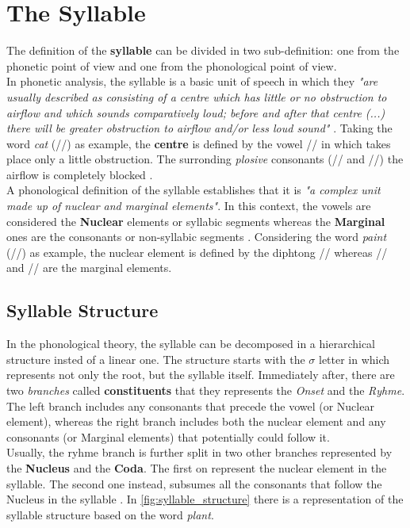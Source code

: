 \section{The Syllable}
\label{sec:The syllable}
The definition of the \textbf{syllable} can be divided in two sub-definition: one from the phonetic point of view and one from the phonological point of view. \\
\noindent In phonetic analysis, the syllable is a basic unit of speech in which they \textit{"are usually described as consisting of a centre which has little or no obstruction to airflow and which sounds comparatively loud; before and after that centre (...) there will be greater obstruction to airflow and/or less loud sound"} \cite{roach2000phonology}. Taking the word \textit{cat} (//) as example, the \textbf{centre} is defined by the vowel /\textipa{\ae}/ in which takes place only a little obstruction. The surronding \textit{plosive} consonants (// and //) the airflow is completely blocked \cite{syllable_site}. \\
\noindent A phonological definition of the syllable establishes that it is \textit{"a complex unit made up of nuclear and marginal elements"}\cite{laver1994principles}. In this context, the vowels are considered the \textbf{Nuclear} elements or syllabic segments whereas the \textbf{Marginal} ones are the consonants or non-syllabic segments \cite{syllable_site}. Considering the word \textit{paint} (//) as example, the nuclear element is defined by the diphtong // whereas // and // are the marginal elements.

\subsection{Syllable Structure}
In the phonological theory, the syllable can be decomposed in a hierarchical structure insted of a linear one. The structure starts with the $\sigma$ letter in which represents not only the root, but the syllable itself. Immediately after, there are two \textit{branches} called \textbf{constituents} that they represents the \textit{Onset} and the \textit{Ryhme}. The left branch includes any consonants that precede the vowel (or Nuclear element), whereas the right branch includes both the nuclear element and any consonants (or Marginal elements) that potentially could follow it. \\
\noindent Usually, the ryhme branch is further split in two other branches represented by the \textbf{Nucleus} and the \textbf{Coda}. The first on represent the nuclear element in the syllable. The second one instead, subsumes all the consonants that follow the Nucleus in the syllable \cite{syllable_site}. In \ref{fig:syllable_structure} there is a representation of the syllable structure based on the word \textit{plant}.

